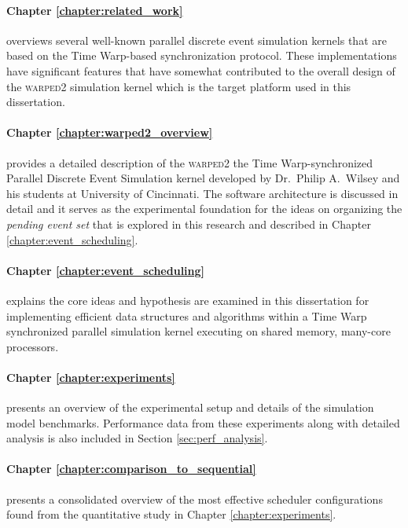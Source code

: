\documentclass[11pt]{book}
\begin{document}
\paragraph{Chapter \ref{chapter:related_work}} overviews several well-known parallel
discrete event simulation kernels that are based on the Time Warp-based synchronization
protocol. These implementations have significant features that have somewhat contributed to the overall design
of the \textsc{warped2} simulation kernel which is the target platform used in this dissertation.

\paragraph{Chapter \ref{chapter:warped2_overview}} provides a detailed description of
the \textsc{warped2} the Time Warp-synchronized Parallel Discrete Event Simulation kernel developed by
Dr.\ Philip A.\ Wilsey and his students at University of Cincinnati.  The software architecture is discussed
in detail and it serves as the experimental foundation for the ideas on organizing the \emph{pending event
  set} that is explored in this research and described in Chapter \ref{chapter:event_scheduling}.

\paragraph{Chapter \ref{chapter:event_scheduling}} explains the core ideas and hypothesis are examined in this
dissertation for implementing efficient data structures and algorithms within a Time Warp synchronized
parallel simulation kernel executing on shared memory, many-core processors.

\paragraph{Chapter \ref{chapter:experiments}} presents an overview of the experimental setup and
details of the simulation model benchmarks.  Performance data from these experiments along with
detailed analysis is also included in Section \ref{sec:perf_analysis}.

\paragraph{Chapter \ref{chapter:comparison_to_sequential}} presents a consolidated overview of the most
effective scheduler configurations found from the quantitative study in Chapter \ref{chapter:experiments}.
\end{document}
